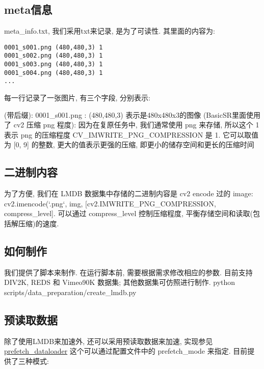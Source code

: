 \documentclass[../main.tex]{subfiles}
\begin{document}
\subsection{meta信息}

meta\_info.txt, 我们采用txt来记录, 是为了可读性. 其里面的内容为:
\begin{verbatim}
0001_s001.png (480,480,3) 1
0001_s002.png (480,480,3) 1
0001_s003.png (480,480,3) 1
0001_s004.png (480,480,3) 1
...
\end{verbatim}

每一行记录了一张图片, 有三个字段, 分别表示:
\begin{enumerate}
 (带后缀): 0001\_s001.png
: (480,480,3) 表示是480x480x3的图像
 (BasicSR里面使用了 cv2 压缩 png 程度): 因为在复原任务中, 我们通常使用 png 来存储, 所以这个 1 表示 png 的压缩程度 
CV\_IMWRITE\_PNG\_COMPRESSION 是 1. 它可以取值为 [0, 9] 的整数, 更大的值表示更强的压缩, 即更小的储存空间和更长的压缩时间
\end{enumerate}

\subsection{二进制内容}

为了方便, 我们在 LMDB 数据集中存储的二进制内容是 cv2 encode 过的 image: cv2.imencode(`.png`, img, [cv2.IMWRITE\_PNG\_COMPRESSION, compress\_level]. 可以通过 compress\_level 控制压缩程度, 平衡存储空间和读取(包括解压缩)的速度.

\subsection{如何制作}

我们提供了脚本来制作. 在运行脚本前, 需要根据需求修改相应的参数. 目前支持 DIV2K, REDS 和 Vimeo90K 数据集; 其他数据集可仿照进行制作.
python scripts/data\_preparation/create\_lmdb.py

\subsection{预读取数据}

除了使用LMDB来加速外, 还可以采用预读取数据来加速, 实现参见\href{https://github.com/XPixelGroup/BasicSR/blob/master/basicsr/data/prefetch_dataloader.py}{prefetch\_dataloader}
这个可以通过配置文件中的 prefetch\_mode 来指定. 目前提供了三种模式:
\end{document}

